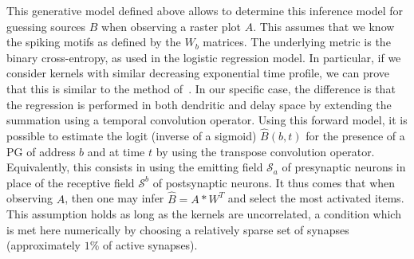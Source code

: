 \documentclass[runningheads]{llncs}
\newcommand{\presynaddr}{a} %
\newcommand{\postsynaddr}{b} %
\newcommand{\arank}{r} %
\newcommand{\bias}{b} %
\newcommand{\synapse}{\mathcal{S}} %
\newcommand{\activeweights}{\mathcal{W}}
\newcommand{\timev}{t} %
\newcommand{\Nclass}{N_\text{class}} %
\newcommand{\Nspeed}{N_v}
\begin{document}
% 
This generative model defined above allows to determine this inference model for guessing sources $B$ when observing a raster plot $A$. This assumes that we know the spiking motifs as defined by the $W_b$ matrices. The underlying metric is the binary cross-entropy, as used in the logistic regression model. In particular, if we consider kernels with similar decreasing exponential time profile, we can prove that this is similar to the method of~\cite{berens_fast_2012}. In our specific case, the difference is that the regression is performed in both dendritic and delay space by extending the summation using a temporal convolution operator. Using this forward model, it is possible to estimate the logit (inverse of a sigmoid) $\hat{B}(b, t)$ for the presence of a PG of address $b$ and at time $t$ by using the transpose convolution operator. Equivalently, this consists in using the emitting field $\synapse_\presynaddr$ of presynaptic neurons in place of the receptive field $\synapse^\postsynaddr$ of postsynaptic neurons. It thus comes that when observing $A$, then one may infer $\hat{B} = A \ast W^T$ and select the most activated items. This assumption holds as long as the kernels are uncorrelated, a condition which is met here numerically by choosing a relatively sparse set of synapses (approximately $1\%$ of active synapses).
%
%
%
\end{document}
